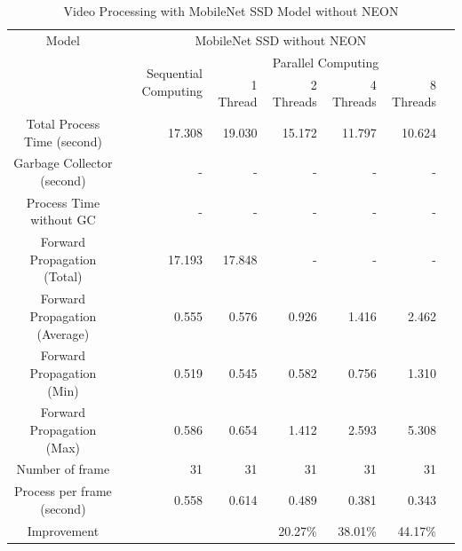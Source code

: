             \begin{table}[!htp]\centering
                \scriptsize
                \begin{tabular}{lrrrrrrr}\toprule
                    \multicolumn{2}{c}{Model} &\multicolumn{5}{c}{MobileNet SSD without NEON} \\\cmidrule{1-7}
                    \multicolumn{2}{c}{\multirow{2}{*}{}} &\multirow{2}{*}{Sequential Computing} &\multicolumn{4}{c}{Parallel Computing} \\\cmidrule{4-7}
                    & & &1 Thread &2 Threads &4 Threads &8 Threads \\\midrule
                    \multicolumn{2}{c}{Total Process Time (second)} &17.308 &19.030 &15.172 &11.797 &10.624 \\
                    \multicolumn{2}{c}{Garbage Collector (second)} &- &- &- &- &- \\
                    \multicolumn{2}{c}{Process Time without GC} &- &- &- &- &- \\
                    \multicolumn{2}{c}{Forward Propagation (Total)} &17.193 &17.848 &- &- &- \\
                    \multicolumn{2}{c}{Forward Propagation (Average)} &0.555 &0.576 &0.926 &1.416 &2.462 \\
                    \multicolumn{2}{c}{Forward Propagation (Min)} &0.519 &0.545 &0.582 &0.756 &1.310 \\
                    \multicolumn{2}{c}{Forward Propagation (Max)} &0.586 &0.654 &1.412 &2.593 &5.308 \\
                    \multicolumn{2}{c}{Number of frame} &31 &31 &31 &31 &31 \\
                    \multicolumn{2}{c}{Process per frame (second)} &0.558 &0.614 &0.489 &0.381 &0.343 \\
                    \multicolumn{2}{c}{Improvement} & & &20.27\% &38.01\% &44.17\% \\
                    \bottomrule
                \end{tabular}

                \caption{Video Processing with MobileNet SSD Model without NEON}\label{ssd:non-neon-performance}
            \end{table}

